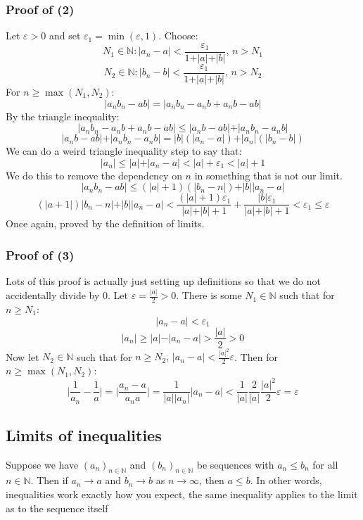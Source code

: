 \documentclass[12pt]{article}
\newcommand{\seq}[2]{(#1_#2)_{#2\in\mathbb{N}}}
\begin{document}
\subsubsection*{Proof of (2)}
Let \(\varepsilon>0\) and set \(\varepsilon_1=\min(\varepsilon,1)\). Choose:
\[N_1\in\mathbb{N}:\vert a_n-a\vert<\frac{\varepsilon_1}{1+\vert a\vert + \vert b\vert},\,n>N_1\]
\[N_2\in\mathbb{N}:\vert b_n-b\vert<\frac{\varepsilon_1}{1+\vert a\vert + \vert b\vert},\,n>N_2\]
For \(n\geq\max(N_1,N_2)\):
\[\vert a_nb_n-ab\vert=\vert a_nb_n-a_nb+a_nb-ab\vert\]
By the triangle inequality:
\[\vert a_nb_n-a_nb+a_nb-ab\vert\leq\vert a_nb-ab\vert+\vert a_nb_n-a_nb\vert\]
\[\vert a_nb-ab\vert+\vert a_nb_n-a_nb\vert=\vert b\vert(\vert a_n-a\vert)+\vert a_n\vert(\vert b_n-b\vert)\]
We can do a weird triangle inequality step to say that:
\[\vert a_n\vert\leq\vert a\vert +\vert a_n-a\vert < \vert a\vert +\varepsilon_1<\vert a\vert + 1\]
We do this to remove the dependency on \(n\) in something that is not our limit.
\[\vert a_nb_n-ab\vert\leq (\vert a\vert+1)(\vert b_n-n\vert)+\vert b\vert\vert a_n-a\vert\]
\[(\vert a+1\vert)\vert b_n-n\vert+\vert b\vert\vert a_n-a\vert<\frac{(\vert a\vert+1)\varepsilon_1}{\vert a\vert + \vert b\vert + 1}+\frac{\vert b\vert\varepsilon_1}{\vert a\vert +\vert b\vert+1}<\varepsilon_1\leq\varepsilon\]
Once again, proved by the definition of limits.
\subsubsection*{Proof of (3)}
Lots of this proof is actually just setting up definitions so that we do not accidentally divide by 0. Let \(\varepsilon=\frac{\vert a\vert}{2}>0\). There is some \(N_1\in\mathbb{N}\) such that for \(n\geq N_1\):
\[\vert a_n-a\vert<\varepsilon_1\]
\[\vert a_n\vert\geq \vert a\vert-\vert a_n-a\vert>\frac{\vert a\vert}{2}>0\]
Now let \(N_2\in\mathbb{N}\) such that for \(n\geq N_2,\,\vert a_n-a\vert<\frac{\vert a\vert^2}{2}\varepsilon\). Then for \(n\geq\max(N_1,N_2)\):
\[\vert\frac{1}{a_n}-\frac{1}{a}\vert=\vert\frac{a_n-a}{a_na}\vert = \frac{1}{\vert a\vert\vert a_n\vert}\vert a_n-a\vert<\frac{1}{\vert a\vert}\frac{2}{\vert a\vert}\frac{\vert a\vert^2}{2}\varepsilon=\varepsilon\]
\subsection*{Limits of inequalities}
Suppose we have \(\seq{a}{n}\) and \(\seq{b}{n}\) be sequences with \(a_n\leq b_n\) for all \(n\in\mathbb{N}\). Then if \(a_n\to a\) and \(b_n\to b\) as \(n\to\infty\), then \(a\leq b\). In other words, inequalities work exactly how you expect, the same inequality applies to the limit as to the sequence itself 
\end{document}
